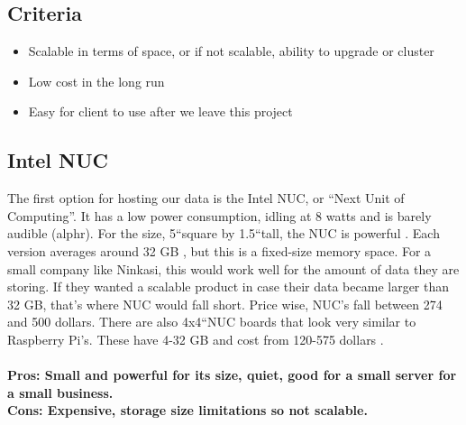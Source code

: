 \documentclass[draftclsnofoot,onecolumn,letterpaper,10pt,compsoc]{IEEEtran}
\begin{document}
		\subsection{Criteria}
		\begin{itemize}
  \item Scalable in terms of space, or if not scalable, ability to upgrade or cluster
  \item Low cost in the long run
  \item Easy for client to use after we leave this project
\end{itemize}

	\subsection{Intel NUC}
            The first option for hosting our data is the Intel NUC, or “Next Unit of Computing”.
						It has a low power consumption, idling at 8 watts and is barely audible (alphr). For the size, 5\textquotedblleft square by 1.5\textquotedblleft tall, the NUC is powerful \cite{IntelNUCReview}.
						Each version averages around 32 GB \cite{Intel}, but this is a fixed-size memory space.
						For a small company like Ninkasi, this would work well for the amount of data they are storing.
						If they wanted a scalable product in case their data became larger than 32 GB, that’s where NUC would fall short.
						Price wise, NUC's  fall between 274 and 500 dollars\cite{PCWorld}.
						There are also 4x4\textquotedblleft NUC boards that look very similar to Raspberry Pi's.
						These have 4-32 GB and cost from 120-575 dollars \cite{Intel}.
				\\ \\
				\textbf{Pros: Small and powerful for its size, quiet, good for a small server for a small business.}
				\\
        \textbf{Cons: Expensive, storage size limitations so not scalable.}
\end{document}
